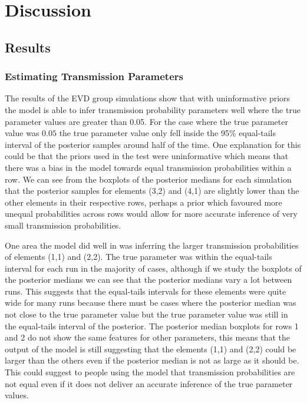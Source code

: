 \documentclass[11pt,a4paper]{report}
\begin{document}
\chapter{Discussion}
\section{Results}
\subsection{Estimating Transmission Parameters}
The results of the EVD group simulations show that with uninformative priors the model is able to infer transmission probability parameters well where the true parameter values are greater than 0.05. For the case where the true parameter value was $0.05$ the true parameter value only fell inside the 95\% equal-tails interval of the posterior samples around half of the time. One explanation for this could be that the priors used in the test were uninformative which means that there was a bias in the model towards equal transmission probabilities within a row. We can see from the boxplots of the posterior medians for each simulation that the posterior samples for elements (3,2) and (4,1) are slightly lower than the other elements in their respective rows, perhaps a prior which favoured more unequal probabilities across rows would allow for more accurate inference of very small transmission probabilities.

One area the model did well in was inferring the larger transmission probabilities of elements (1,1) and (2,2). The true parameter was within the equal-tails interval for each run in the majority of cases, although if we study the boxplots of the posterior medians we can see that the posterior medians vary a lot between runs. This suggests that the equal-tails intervals for these elements were quite wide for many runs because there must be cases where the posterior median was not close to the true parameter value but the true parameter value was still in the equal-tails interval of the posterior. The posterior median boxplots for rows 1 and 2 do not show the same features for other parameters, this means that the output of the model is still suggesting that the elements (1,1) and (2,2) could be larger than the others even if the posterior median is not as large as it should be. This could suggest to people using the model that transmission probabilities are not equal even if it does not deliver an accurate inference of the true parameter values.
\end{document}
